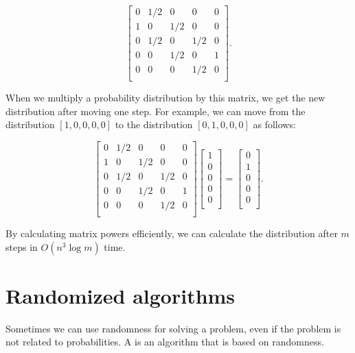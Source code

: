 \[ 
 \begin{bmatrix}
  0 & 1/2 & 0 & 0 & 0 \\
  1 & 0 & 1/2 & 0 & 0 \\
  0 & 1/2 & 0 & 1/2 & 0 \\
  0 & 0 & 1/2 & 0 & 1 \\
  0 & 0 & 0 & 1/2 & 0 \\
 \end{bmatrix}.
\]

When we multiply a probability distribution by this matrix,
we get the new distribution after moving one step.
For example, we can move from the distribution
$[1,0,0,0,0]$ to the distribution
$[0,1,0,0,0]$ as follows:

\[ 
 \begin{bmatrix}
  0 & 1/2 & 0 & 0 & 0 \\
  1 & 0 & 1/2 & 0 & 0 \\
  0 & 1/2 & 0 & 1/2 & 0 \\
  0 & 0 & 1/2 & 0 & 1 \\
  0 & 0 & 0 & 1/2 & 0 \\
 \end{bmatrix}
 \begin{bmatrix}
  1 \\
  0 \\
  0 \\
  0 \\
  0 \\
 \end{bmatrix}
=
 \begin{bmatrix}
  0 \\
  1 \\
  0 \\
  0 \\
  0 \\
 \end{bmatrix}.
\]

By calculating matrix powers efficiently,
we can calculate the distribution after $m$ steps
in $O(n^3 \log m)$ time.

\section{Randomized algorithms}


Sometimes we can use randomness for solving a problem,
even if the problem is not related to probabilities.
A  is an algorithm that
is based on randomness.

